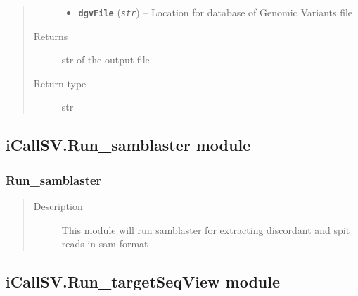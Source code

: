 \documentclass[letterpaper,10pt,english]{sphinxmanual}
\begin{document}
\begin{fulllineitems}
\begin{quote}
\begin{description}
\begin{itemize}
\item {} 
\textbf{\texttt{dgvFile}} (\emph{\texttt{str}}) -- Location for database of Genomic Variants file

\end{itemize}

\item[{Returns}] \leavevmode
str of the output file

\item[{Return type}] \leavevmode
str

\end{description}\end{quote}

\end{fulllineitems}



\subsection{iCallSV.Run\_samblaster module}
\label{iCallSV:icallsv-run-samblaster-module}\label{iCallSV:module-iCallSV.Run_samblaster}

\subsubsection{Run\_samblaster}
\label{iCallSV:run-samblaster}\begin{quote}\begin{description}
\item[{Description}] \leavevmode
This module will run samblaster for extracting discordant and spit reads in sam format

\end{description}\end{quote}

\begin{fulllineitems}
\label{iCallSV:iCallSV.Run_samblaster.run}
\end{fulllineitems}



\subsection{iCallSV.Run\_targetSeqView module}
\label{iCallSV:module-iCallSV.Run_targetSeqView}\label{iCallSV:icallsv-run-targetseqview-module}
\end{document}
